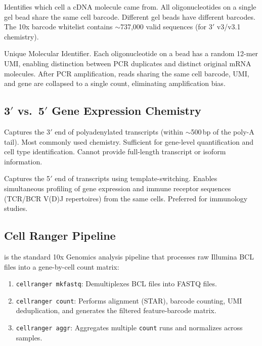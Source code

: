 \begin{keyconcept}[title={Cell Barcodes and UMIs}]
\begin{description}[nosep]
  \item[Cell barcode (16\,nt):] Identifies which cell a cDNA molecule came from.
    All oligonucleotides on a single gel bead share the same cell barcode.
    Different gel beads have different barcodes. The 10x barcode whitelist
    contains $\sim$737,000 valid sequences (for 3$'$ v3/v3.1 chemistry).
  \item[UMI (12\,nt):] Unique Molecular Identifier. Each oligonucleotide on a
    bead has a random 12-mer UMI, enabling distinction between PCR duplicates
    and distinct original mRNA molecules. After PCR amplification, reads sharing
    the same cell barcode, UMI, and gene are collapsed to a single count,
    eliminating amplification bias.
\end{description}
\end{keyconcept}

\subsection{3$'$ vs.\ 5$'$ Gene Expression Chemistry}

\begin{description}[style=nextline]
  \item[3$'$ Gene Expression (GEX)] Captures the 3$'$ end of polyadenylated
    transcripts (within $\sim$500\,bp of the poly-A tail). Most commonly used
    chemistry. Sufficient for gene-level quantification and cell type
    identification. Cannot provide full-length transcript or isoform information.
  \item[5$'$ Gene Expression (GEX)] Captures the 5$'$ end of transcripts using
    template-switching. Enables simultaneous profiling of gene expression and
    immune receptor sequences (TCR/BCR V(D)J repertoires) from the same cells.
    Preferred for immunology studies.
\end{description}

\subsection{Cell Ranger Pipeline}

 is the standard 10x Genomics analysis pipeline that
processes raw Illumina BCL files into a gene-by-cell count matrix:

\begin{enumerate}[nosep]
  \item \texttt{cellranger mkfastq}: Demultiplexes BCL files into FASTQ files.
  \item \texttt{cellranger count}: Performs alignment (STAR), barcode counting,
    UMI deduplication, and generates the filtered feature-barcode matrix.
  \item \texttt{cellranger aggr}: Aggregates multiple \texttt{count} runs and
    normalizes across samples.
\end{enumerate}

